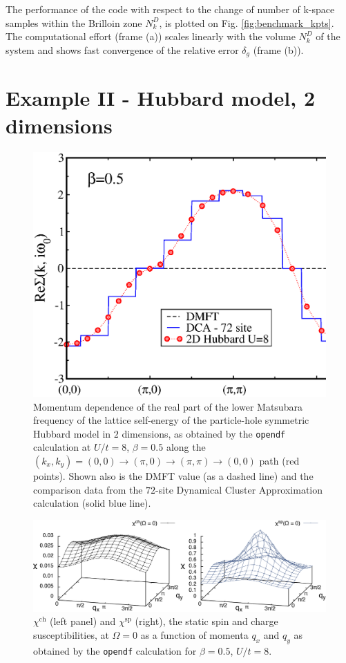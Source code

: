 \documentclass[3p,times,procedia]{elsarticle}
\begin{document}
The performance of the code with respect to the change of number of k-space samples within the Brilloin zone $N_k^D$, is plotted on Fig. \ref{fig:benchmark_kpts}. The computational effort (frame (a)) scales linearly with the volume $N_k^D$ of the system and shows fast convergence of the relative error $\delta_g$ (frame (b)).

\section{Example II - Hubbard model, 2 dimensions}\label{sec:ex}

\begin{figure}[ht]
\centering
\includegraphics[width=0.6\columnwidth]{DF_U12.eps}
\caption{Momentum dependence of the real part of the lower Matsubara frequency of the lattice self-energy of the particle-hole symmetric Hubbard model in $2$ dimensions, as obtained by the \texttt{opendf} calculation at $U/t = 8$, $\beta = 0.5$ along the $(k_x,k_y) = (0,0)\to(\pi,0)\to(\pi,\pi)\to(0,0)$ path (red points). Shown also is the DMFT value (as a dashed line) and the comparison data from the $72$-site Dynamical Cluster Approximation calculation (solid blue line).}
\label{fig:sigma}
\end{figure}

\begin{figure}[ht]
\centering
\includegraphics[width=\columnwidth]{susc.pdf}
\caption{$\chi^{\mathrm{ch}}$ (left panel) and $\chi^{\mathrm{sp}}$ (right), the static spin and charge susceptibilities, at $\Omega = 0$ as a function of momenta $q_x$ and $q_y$ as obtained by the \texttt{opendf} calculation for $\beta = 0.5$, $U/t = 8$. }
\label{fig:susc}
\end{figure}
\end{document}
